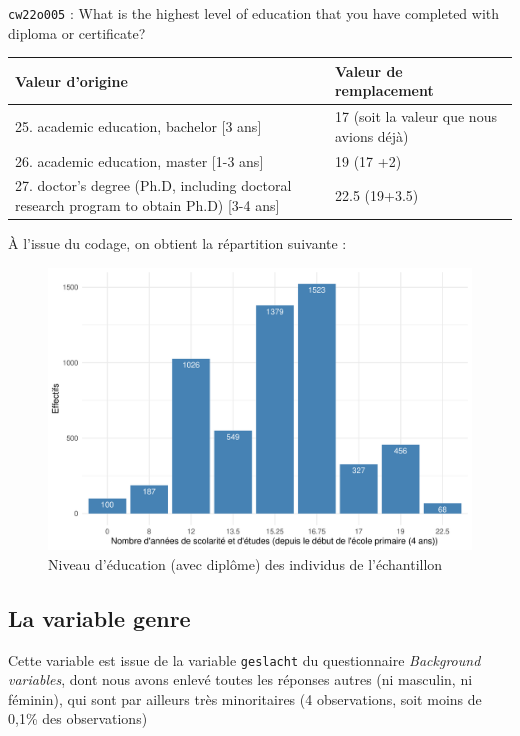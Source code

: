 \documentclass[a4paper, french, 11 pt]{article}\usepackage[]{graphicx}\usepackage[]{xcolor}
\begin{document}
\vspace{0,5cm}
\begin{minipage}{0,8\linewidth}
{\footnotesize\texttt{cw22o005} : What is the highest level of education that you have completed with diploma or certificate?
\vspace{0,2cm}

\begin{tabular}{m{0,5\linewidth}m{0,5\linewidth}}
\hline
Valeur d'origine & Valeur de remplacement \\
\hline
25. academic education, bachelor [3 ans] & 17 (soit la valeur que nous avions déjà) \\
26. academic education, master [1-3 ans] & 19 (17 +2) \\
27. doctor's degree (Ph.D, including doctoral research program to obtain Ph.D) [3-4 ans] & 22.5 (19+3.5) \\
\hline
\end{tabular}}
\end{minipage}

À l'issue du codage, on obtient la répartition suivante : 

\begin{figure}[h]
\center
\includegraphics[width=0.7\linewidth]{figure/educ.pdf}
\caption{Niveau d'éducation (avec diplôme) des individus de l'échantillon}
\end{figure}

\subsection{La variable genre}

Cette variable est issue de la variable \texttt{geslacht} du questionnaire \textit{Background variables}, dont nous avons enlevé toutes les réponses autres (ni masculin, ni féminin), qui sont par ailleurs très minoritaires (4 observations, soit moins de 0,1\% des observations)
\end{document}
